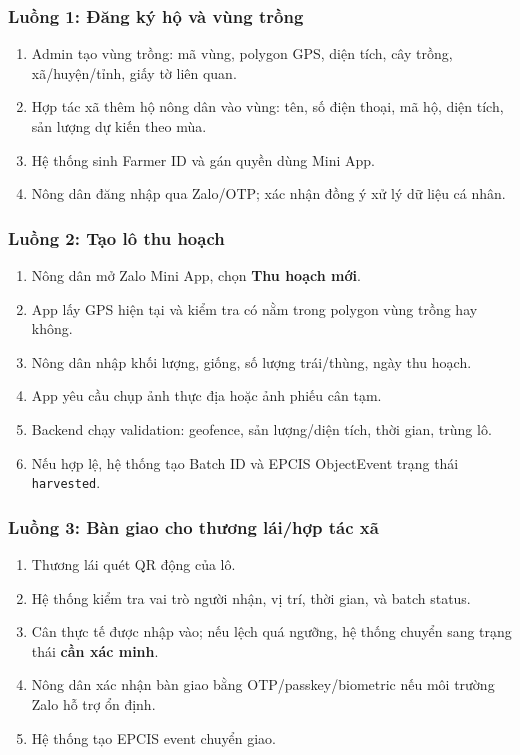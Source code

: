 \documentclass[12pt,a4paper]{article}
\begin{document}
\subsubsection{Luồng 1: Đăng ký hộ và vùng trồng}

\begin{enumerate}[leftmargin=2em]
    \item Admin tạo vùng trồng: mã vùng, polygon GPS, diện tích, cây trồng, xã/huyện/tỉnh, giấy tờ liên quan.
    \item Hợp tác xã thêm hộ nông dân vào vùng: tên, số điện thoại, mã hộ, diện tích, sản lượng dự kiến theo mùa.
    \item Hệ thống sinh Farmer ID và gán quyền dùng Mini App.
    \item Nông dân đăng nhập qua Zalo/OTP; xác nhận đồng ý xử lý dữ liệu cá nhân.
\end{enumerate}

\subsubsection{Luồng 2: Tạo lô thu hoạch}

\begin{enumerate}[leftmargin=2em]
    \item Nông dân mở Zalo Mini App, chọn \textbf{Thu hoạch mới}.
    \item App lấy GPS hiện tại và kiểm tra có nằm trong polygon vùng trồng hay không.
    \item Nông dân nhập khối lượng, giống, số lượng trái/thùng, ngày thu hoạch.
    \item App yêu cầu chụp ảnh thực địa hoặc ảnh phiếu cân tạm.
    \item Backend chạy validation: geofence, sản lượng/diện tích, thời gian, trùng lô.
    \item Nếu hợp lệ, hệ thống tạo Batch ID và EPCIS ObjectEvent trạng thái \texttt{harvested}.
\end{enumerate}

\subsubsection{Luồng 3: Bàn giao cho thương lái/hợp tác xã}

\begin{enumerate}[leftmargin=2em]
    \item Thương lái quét QR động của lô.
    \item Hệ thống kiểm tra vai trò người nhận, vị trí, thời gian, và batch status.
    \item Cân thực tế được nhập vào; nếu lệch quá ngưỡng, hệ thống chuyển sang trạng thái \textbf{cần xác minh}.
    \item Nông dân xác nhận bàn giao bằng OTP/passkey/biometric nếu môi trường Zalo hỗ trợ ổn định.
    \item Hệ thống tạo EPCIS event chuyển giao.
\end{enumerate}
\end{document}
